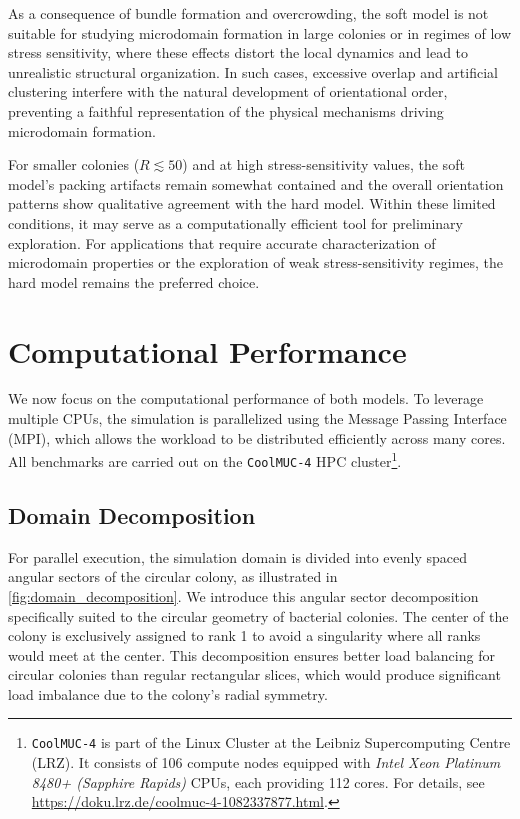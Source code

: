 \documentclass[a4paper,fleqn]{cas-dc}
\providecommand{\DIFaddend}{} %
\DeclareRobustCommand{\DIFaddend}{\DIFOaddend \let\includegraphics\DIFOincludegraphics} %
\begin{document}
\DIFaddend As a consequence of bundle formation and overcrowding, the soft model is not suitable for studying microdomain formation in large colonies or in regimes of low stress sensitivity, where these effects distort the local dynamics and lead to unrealistic structural organization. In such cases, excessive overlap and artificial clustering interfere with the natural development of orientational order, preventing a faithful representation of the physical mechanisms driving microdomain formation.

For smaller colonies ($R \lesssim 50$) and at high stress-sensitivity values, the
soft model's packing artifacts remain somewhat contained and
the overall orientation patterns show qualitative agreement with the hard model.
Within these limited conditions, it may serve as a computationally efficient tool
for preliminary exploration. For applications that require accurate characterization of microdomain properties or the exploration of weak stress-sensitivity regimes, the hard model remains the preferred choice.



\section{Computational Performance}
\label{sec:performance_analysis}

We now focus on the computational performance of both models. To leverage multiple CPUs, the simulation is parallelized using the Message Passing Interface (MPI), which allows the workload to be distributed efficiently across many cores. All benchmarks are carried out on the \texttt{CoolMUC-4} HPC cluster\footnote{\texttt{CoolMUC-4} is part of the Linux Cluster at the Leibniz Supercomputing Centre (LRZ). It consists of 106 compute nodes equipped with \textit{Intel Xeon Platinum 8480+ (Sapphire Rapids)} CPUs, each providing 112 cores. For details, see \url{https://doku.lrz.de/coolmuc-4-1082337877.html}.}.

\subsection{Domain Decomposition}

For parallel execution, the simulation domain is divided into evenly spaced angular sectors of the circular colony, as illustrated in \autoref{fig:domain_decomposition}. We introduce this angular sector decomposition specifically suited to the circular geometry of bacterial colonies. The center of the colony is exclusively assigned to rank 1 to avoid a singularity where all ranks would meet at the center. This decomposition ensures better load balancing for circular colonies than regular rectangular slices, which would produce significant load imbalance due to the colony's radial symmetry.
\end{document}
